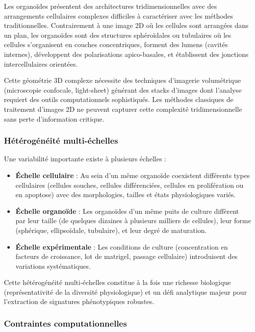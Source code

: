 Les organoïdes présentent des architectures tridimensionnelles avec des arrangements cellulaires complexes difficiles à caractériser avec les méthodes traditionnelles. Contrairement à une image 2D où les cellules sont arrangées dans un plan, les organoïdes sont des structures sphéroïdales ou tubulaires où les cellules s'organisent en couches concentriques, forment des lumens (cavités internes), développent des polarisations apico-basales, et établissent des jonctions intercellulaires orientées.

Cette géométrie 3D complexe nécessite des techniques d'imagerie volumétrique (microscopie confocale, light-sheet) générant des stacks d'images dont l'analyse requiert des outils computationnels sophistiqués. Les méthodes classiques de traitement d'images 2D ne peuvent capturer cette complexité tridimensionnelle sans perte d'information critique.

\subsubsection{Hétérogénéité multi-échelles}

Une variabilité importante existe à plusieurs échelles :
\begin{itemize}
    \item \textbf{Échelle cellulaire} : Au sein d'un même organoïde coexistent différents types cellulaires (cellules souches, cellules différenciées, cellules en prolifération ou en apoptose) avec des morphologies, tailles et états physiologiques variés.
    \item \textbf{Échelle organoïde} : Les organoïdes d'un même puits de culture diffèrent par leur taille (de quelques dizaines à plusieurs milliers de cellules), leur forme (sphérique, ellipsoïdale, tubulaire), et leur degré de maturation.
    \item \textbf{Échelle expérimentale} : Les conditions de culture (concentration en facteurs de croissance, lot de matrigel, passage cellulaire) introduisent des variations systématiques.
\end{itemize}

Cette hétérogénéité multi-échelles constitue à la fois une richesse biologique (représentativité de la diversité physiologique) et un défi analytique majeur pour l'extraction de signatures phénotypiques robustes.

\subsubsection{Contraintes computationnelles}

